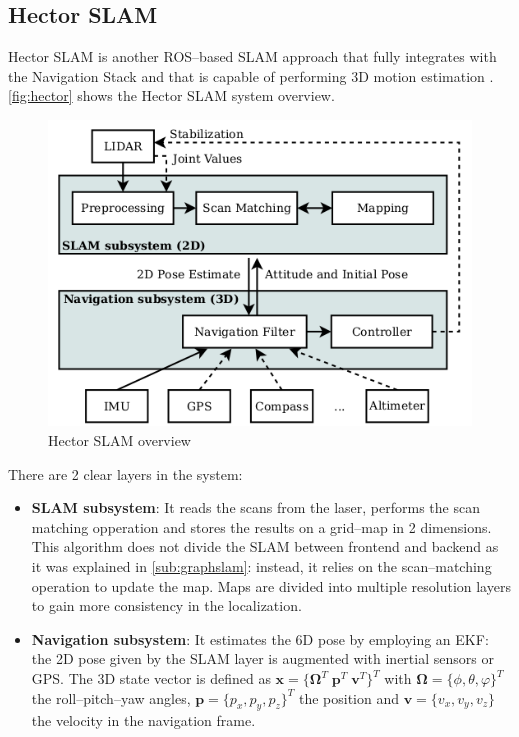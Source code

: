 \subsection{Hector SLAM} \label{sub:hector}

Hector SLAM is another ROS--based SLAM approach that fully integrates with the Navigation Stack and that is capable of performing 3D motion estimation . \autoref{fig:hector} shows the Hector SLAM system overview.
\begin{figure}[htb]
  \centering
  \includegraphics[width=\linewidth]{pictures/03/hector}
  \caption{Hector SLAM overview}
  \label{fig:hector}
\end{figure}  

There are 2 clear layers in the system:
\begin{itemize}
  \item \textbf{SLAM subsystem}: It reads the scans from the laser, performs the scan matching opperation and stores the results on a grid--map in 2 dimensions. This algorithm does not divide the SLAM between frontend and backend as it was explained in \autoref{sub:graphslam}: instead, it relies on the scan--matching operation to update the map. Maps are divided into multiple resolution layers to gain more consistency in the localization.

  \item \textbf{Navigation subsystem}: It estimates the 6D pose by employing an EKF: the 2D pose given by the SLAM layer is augmented with inertial sensors or GPS. The 3D state vector is defined as $\mathbf{x}=\{\mathbf{\Omega}^T\;\mathbf{p}^T\;\mathbf{v}^T\}^T$ with $\mathbf{\Omega} = \{\phi,\theta,\varphi\}^T$ the roll--pitch--yaw angles, $\mathbf{p}=\{p_x,p_y,p_z\}^T$ the position and $\mathbf{v}=\{v_x,v_y,v_z\}$ the velocity in the navigation frame.
\end{itemize}  

